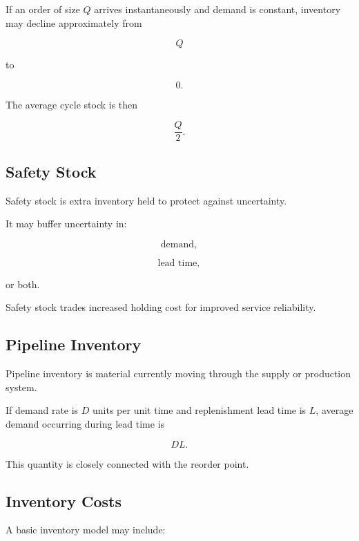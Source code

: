 If an order of size \(Q\) arrives instantaneously and demand is constant,
inventory may decline approximately from

\[
Q
\]

to

\[
0.
\]

The average cycle stock is then

\[
\boxed{
\frac{Q}{2}.
}
\]

\subsection{Safety Stock}
\label{subsec:safety-stock}

Safety stock is extra inventory held to protect against uncertainty.

It may buffer uncertainty in:

\[
\boxed{
\text{demand},
}
\]

\[
\boxed{
\text{lead time},
}
\]

or both.

Safety stock trades increased holding cost for improved service
reliability.

\subsection{Pipeline Inventory}
\label{subsec:pipeline-inventory}

Pipeline inventory is material currently moving through the supply or
production system.

If demand rate is \(D\) units per unit time and replenishment lead time is
\(L\), average demand occurring during lead time is

\[
\boxed{
DL.
}
\]

This quantity is closely connected with the reorder point.

\subsection{Inventory Costs}
\label{subsec:inventory-costs}

A basic inventory model may include:


